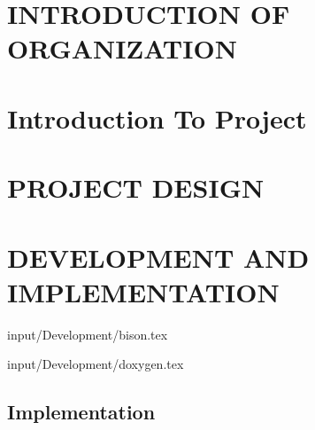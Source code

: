 \documentclass[12pt,includeheadfoot,a4paper]{report}
\begin{document}

\begin{screen}
\ppttitle
\end{screen}

\thispagestyle{empty} 
\pagetitle
\newpage
{}
\cfoot{\thepage}


\newpage


\newpage
\tableofcontents
\newpage
\listoffigures
\newpage
\listoftables
\newpage


\cfoot{\thepage}

\newpage
\chapter{INTRODUCTION OF ORGANIZATION}

\newpage


\chapter{Introduction To Project}








\chapter{PROJECT DESIGN}








\newpage
\chapter{DEVELOPMENT AND IMPLEMENTATION}


 {input/Development/bison.tex}

%
%
%

 {input/Development/doxygen.tex}


\section{Implementation}
\end{document}
